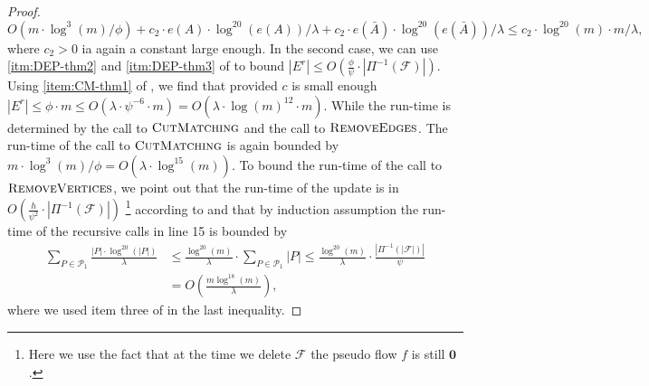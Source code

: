 \documentclass[11pt]{article}
\newcommand\ff{\boldsymbol{\mathit{f}}}
\begin{document}
\begin{proof}
    \[O(m \cdot \log^{3}(m)/\phi) + c_2 \cdot e(A) \cdot \log^{20}(e(A))/\lambda + c_2 \cdot e(\bar{A}) \cdot \log^{20}(e(\bar{A}))/\lambda \leq c_2 \cdot \log^{20}(m) \cdot m / \lambda,\]
    where $c_2 >0$ ia again a constant large enough. In the second case, we can use \cref{itm:DEP-thm2} and \cref{itm:DEP-thm3} of  to bound $|E^r| \leq O(\frac{\phi}{\psi} \cdot |\Pi^{-1}(\mathcal{F})|) $. Using \cref{item:CM-thm1} of , we find that provided $c$ is small enough $|E^r| \leq \phi \cdot m \leq O(\lambda \cdot \psi^{-6} \cdot m) = O(\lambda \cdot \log(m)^{12} \cdot m)$. While the run-time is determined by the call to $\textsc{CutMatching}$ and the call to $\textsc{RemoveEdges}$. The run-time of the call to $\textsc{CutMatching}$ is again bounded by $m\cdot \log^3(m)/\phi = O(\lambda \cdot \log^{15}(m))$. To bound the run-time of the call to $\textsc{RemoveVertices}$, we point out that the run-time of the update is in $O\left(\frac{h}{\psi^2} \cdot |\Pi^{-1}(\mathcal{F})|\right)$ \footnote{Here we use the fact that at the time we delete $\mathcal{F}$ the pseudo flow $\ff$ is still $\boldsymbol{0}$.} according to  and that by induction assumption the run-time of the recursive calls in line 15 is bounded by 
    \begin{align*}
        \sum_{P \in \mathcal{P}_1} \frac{|P| \cdot \log^{20}(|P|)}{\lambda} &\leq \frac{\log^{20}(m)}{\lambda} \cdot \sum_{P \in \mathcal{P}_1} |P| \leq \frac{\log^{20}(m)}{\lambda} \cdot \frac{|\Pi^{-1}(|\mathcal{F}|)|}{\psi} \\
        &= O\left(\frac{m \log^{18}(m)}{\lambda}\right),
    \end{align*}
    where we used item three of  in the last inequality. 
\end{proof}
\end{document}
